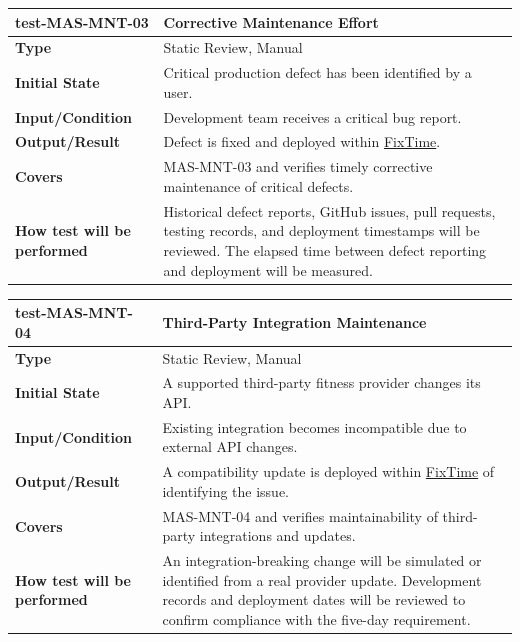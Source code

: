 \documentclass[12pt, titlepage]{article}
\newcommand{\const}[1]{\hyperlink{const:#1}{\textsf{#1}}}
\begin{document}
\vspace{1em}

\noindent\begin{tabularx}{\textwidth}{>{\raggedright\arraybackslash}p{3.5cm}X}
  \toprule
  \textbf{test-MAS-MNT-03} & \textbf{Corrective Maintenance Effort}\\
  \midrule
  \textbf{Type} & Static Review, Manual\\
  \textbf{Initial State} & Critical production defect has been identified by a user.\\
  \textbf{Input/Condition} & Development team receives a critical bug report.\\
  \textbf{Output/Result} & Defect is fixed and deployed within \const{FixTime}.\\
  \textbf{Covers} & MAS-MNT-03 and verifies timely corrective maintenance of critical defects.\\
  \textbf{How test will be performed} & Historical defect reports, GitHub issues, pull requests, testing records, and deployment timestamps will be reviewed. The elapsed time between defect reporting and deployment will be measured.\\
  \bottomrule
\end{tabularx}

\vspace{1em}

\noindent\begin{tabularx}{\textwidth}{>{\raggedright\arraybackslash}p{3.5cm}X}
  \toprule
  \textbf{test-MAS-MNT-04} & \textbf{Third-Party Integration Maintenance}\\
  \midrule
  \textbf{Type} & Static Review, Manual\\
  \textbf{Initial State} & A supported third-party fitness provider changes its API.\\
  \textbf{Input/Condition} & Existing integration becomes incompatible due to external API changes.\\
  \textbf{Output/Result} & A compatibility update is deployed within \const{FixTime} of identifying the issue.\\
  \textbf{Covers} & MAS-MNT-04 and verifies maintainability of third-party integrations and updates.\\
  \textbf{How test will be performed} & An integration-breaking change will be simulated or identified from a real provider update. Development records and deployment dates will be reviewed to confirm compliance with the five-day requirement.\\
  \bottomrule
\end{tabularx}
\end{document}
